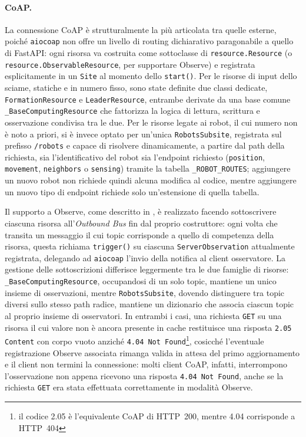 \paragraph{CoAP.}
La connessione \ac{CoAP} è strutturalmente la più articolata tra quelle esterne, poiché \texttt{aiocoap} non offre un livello di routing dichiarativo paragonabile a quello di FastAPI: ogni risorsa va costruita come sottoclasse di \texttt{resource.Resource} (o \texttt{resource.ObservableResource}, per supportare Observe) e registrata esplicitamente in un \texttt{Site} al momento dello \texttt{start()}. Per le risorse di input dello sciame, statiche e in numero fisso, sono state definite due classi dedicate, \texttt{FormationResource} e \texttt{LeaderResource}, entrambe derivate da una base comune \texttt{\_BaseComputingResource} che fattorizza la logica di lettura, scrittura e osservazione condivisa tra le due. Per le risorse legate ai robot, il cui numero non è noto a priori, si è invece optato per un'unica \texttt{RobotsSubsite}, registrata sul prefisso \texttt{/robots} e capace di risolvere dinamicamente, a partire dal path della richiesta, sia l'identificativo del robot sia l'endpoint richiesto (\texttt{position}, \texttt{movement}, \texttt{neighbors} o \texttt{sensing}) tramite la tabella \texttt{\_ROBOT\_ROUTES}; aggiungere un nuovo robot non richiede quindi alcuna modifica al codice, mentre aggiungere un nuovo tipo di endpoint richiede solo un'estensione di quella tabella.

Il supporto a Observe, come descritto in , è realizzato facendo sottoscrivere ciascuna risorsa all'\textit{Outbound Bus} fin dal proprio costruttore: ogni volta che transita un messaggio il cui topic corrisponde a quello di competenza della risorsa, questa richiama \texttt{trigger()} su ciascuna \texttt{ServerObservation} attualmente registrata, delegando ad \texttt{aiocoap} l'invio della notifica al client osservatore. La gestione delle sottoscrizioni differisce leggermente tra le due famiglie di risorse: \texttt{\_BaseComputingResource}, occupandosi di un solo topic, mantiene un unico insieme di osservazioni, mentre \texttt{RobotsSubsite}, dovendo distinguere tra topic diversi sullo stesso path radice, mantiene un dizionario che associa ciascun topic al proprio insieme di osservatori. In entrambi i casi, una richiesta \texttt{GET} su una risorsa il cui valore non è ancora presente in cache restituisce una risposta \texttt{2.05 Content} con corpo vuoto anziché \texttt{4.04 Not Found}\footnote{il codice 2.05 è l'equivalente CoAP di HTTP~200, mentre 4.04 corrisponde a HTTP~404}, cosicché l'eventuale registrazione Observe associata rimanga valida in attesa del primo aggiornamento e il client non termini la connessione: molti client \ac{CoAP}, infatti, interrompono l'osservazione non appena ricevono una risposta \texttt{4.04 Not Found}, anche se la richiesta \texttt{GET} era stata effettuata correttamente in modalità Observe.

